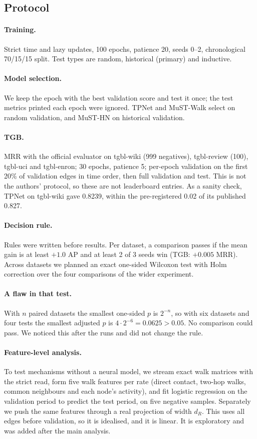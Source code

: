 \documentclass[11pt,a4paper]{article}
\theoremstyle{plain}
\theoremstyle{definition}
\begin{document}
\subsection{Protocol}
\paragraph{Training.} Strict time and lazy updates, 100 epochs, patience 20, seeds 0--2, chronological 70/15/15 split. Test types are random, historical (primary) and inductive.
\paragraph{Model selection.} We keep the epoch with the best validation score and test it once; the test metrics printed each epoch were ignored. TPNet and MuST-Walk select on random validation, and MuST-HN on historical validation.
\paragraph{TGB.} MRR with the official evaluator on tgbl-wiki (999 negatives), tgbl-review (100), tgbl-uci and tgbl-enron; 30 epochs, patience 5; per-epoch validation on the first 20\% of validation edges in time order, then full validation and test. This is not the authors' protocol, so these are not leaderboard entries. As a sanity check, TPNet on tgbl-wiki gave 0.8239, within the pre-registered 0.02 of its published 0.827.
\paragraph{Decision rule.} Rules were written before results. Per dataset, a comparison passes if the mean gain is at least $+1.0$ AP and at least 2 of 3 seeds win (TGB: $+0.005$ MRR). Across datasets we planned an exact one-sided Wilcoxon test \cite{wilcoxon} with Holm correction \cite{holm} over the four comparisons of the wider experiment.
\paragraph{A flaw in that test.} With $n$ paired datasets the smallest one-sided $p$ is $2^{-n}$, so with six datasets and four tests the smallest adjusted $p$ is $4\cdot2^{-6}=0.0625>0.05$. No comparison could pass. We noticed this after the runs and did not change the rule.
\paragraph{Feature-level analysis.} To test mechanisms without a neural model, we stream exact walk matrices with the strict read, form five walk features per rate (direct contact, two-hop walks, common neighbours and each node's activity), and fit logistic regression on the validation period to predict the test period, on five negative samples. Separately we push the same features through a real projection of width $d_R$. This uses all edges before validation, so it is idealised, and it is linear. It is exploratory and was added after the main analysis.
\end{document}
